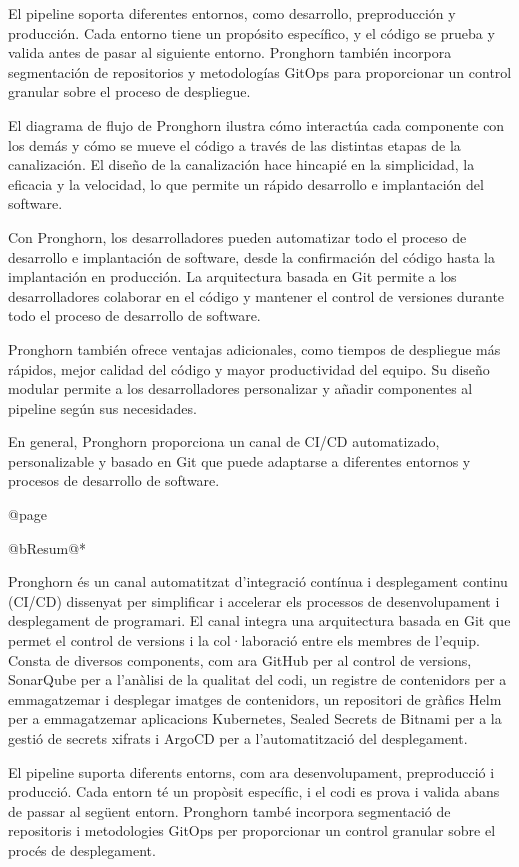 El pipeline soporta diferentes entornos, como desarrollo, preproducción y producción. Cada entorno tiene un propósito específico, y el código se prueba y valida antes de pasar al siguiente entorno. Pronghorn también incorpora segmentación de repositorios y metodologías GitOps para proporcionar un control granular sobre el proceso de despliegue.

El diagrama de flujo de Pronghorn ilustra cómo interactúa cada componente con los demás y cómo se mueve el código a través de las distintas etapas de la canalización. El diseño de la canalización hace hincapié en la simplicidad, la eficacia y la velocidad, lo que permite un rápido desarrollo e implantación del software.

Con Pronghorn, los desarrolladores pueden automatizar todo el proceso de desarrollo e implantación de software, desde la confirmación del código hasta la implantación en producción. La arquitectura basada en Git permite a los desarrolladores colaborar en el código y mantener el control de versiones durante todo el proceso de desarrollo de software.

Pronghorn también ofrece ventajas adicionales, como tiempos de despliegue más rápidos, mejor calidad del código y mayor productividad del equipo. Su diseño modular permite a los desarrolladores personalizar y añadir componentes al pipeline según sus necesidades.

En general, Pronghorn proporciona un canal de CI/CD automatizado, personalizable y basado en Git que puede adaptarse a diferentes entornos y procesos de desarrollo de software.

@page

@b{Resum}@*


Pronghorn és un canal automatitzat d'integració contínua i desplegament continu (CI/CD) dissenyat per simplificar i accelerar els processos de desenvolupament i desplegament de programari. El canal integra una arquitectura basada en Git que permet el control de versions i la col·laboració entre els membres de l'equip. Consta de diversos components, com ara GitHub per al control de versions, SonarQube per a l'anàlisi de la qualitat del codi, un registre de contenidors per a emmagatzemar i desplegar imatges de contenidors, un repositori de gràfics Helm per a emmagatzemar aplicacions Kubernetes, Sealed Secrets de Bitnami per a la gestió de secrets xifrats i ArgoCD per a l'automatització del desplegament.

El pipeline suporta diferents entorns, com ara desenvolupament, preproducció i producció. Cada entorn té un propòsit específic, i el codi es prova i valida abans de passar al següent entorn. Pronghorn també incorpora segmentació de repositoris i metodologies GitOps per proporcionar un control granular sobre el procés de desplegament.

